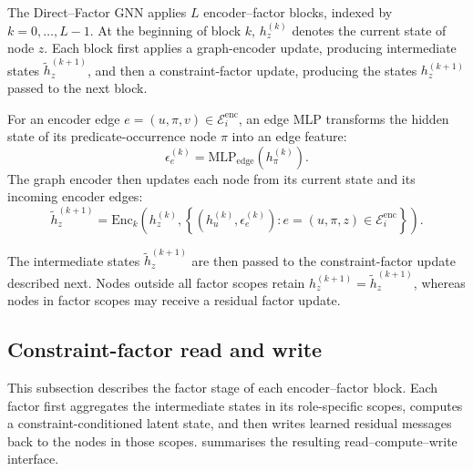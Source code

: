 \documentclass[a4paper,UKenglish,cleveref,autoref,thm-restate]{tgdk-v2021}
\begin{document}
The Direct--Factor GNN applies \(L\) encoder--factor blocks, indexed by \(k=0,\ldots,L-1\). At the beginning of block \(k\), \(h_z^{(k)}\) denotes the current state of node \(z\). Each block first applies a graph-encoder update, producing intermediate states \(\widetilde h_z^{(k+1)}\), and then a constraint-factor update, producing the states \(h_z^{(k+1)}\) passed to the next block.

For an encoder edge \(e=(u,\pi,v)\in\mathcal{E}_i^{\mathrm{enc}}\), an edge MLP transforms the hidden state of its predicate-occurrence node \(\pi\) into an edge feature:
\[
\epsilon_e^{(k)}=\mathrm{MLP}_{\mathrm{edge}}\left(h_\pi^{(k)}\right).
\]
The graph encoder then updates each node from its current state and its incoming encoder edges:
\[
\widetilde h_z^{(k+1)}=\mathrm{Enc}_k\left(h_z^{(k)},\left\{\left(h_u^{(k)},\epsilon_e^{(k)}\right):e=(u,\pi,z)\in\mathcal{E}_i^{\mathrm{enc}}\right\}\right).
\]

The intermediate states \(\widetilde h_z^{(k+1)}\) are then passed to the constraint-factor update described next. Nodes outside all factor scopes retain \(h_z^{(k+1)}=\widetilde h_z^{(k+1)}\), whereas nodes in factor scopes may receive a residual factor update.

\subsection{Constraint-factor read and write}
\label{subsec:factor-update}

This subsection describes the factor stage of each encoder--factor block. Each factor first aggregates the intermediate states in its role-specific scopes, computes a constraint-conditioned latent state, and then writes learned residual messages back to the nodes in those scopes.  summarises the resulting read--compute--write interface.
\end{document}
